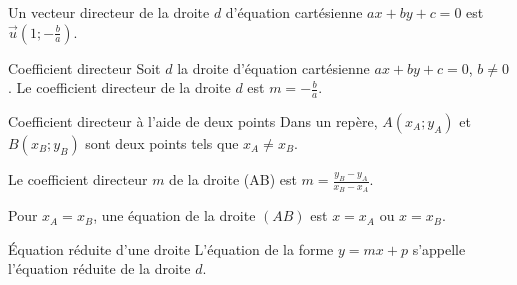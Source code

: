 



\begin{Rq} 
Un vecteur directeur de la droite $d$ d'équation cartésienne $ax+by+c =0$ est $\overrightarrow{u}\left(1;-\frac{b}{a}\right)$.
\end{Rq}




\begin{ThT}{Coefficient directeur}
Soit $d$ la droite d'équation cartésienne $ax+by+c =0$, $b\neq 0$. Le coefficient directeur de la droite $d$ est $m=-\frac{b}{a}$.
\end{ThT}


\begin{ThT}{Coefficient directeur à l'aide de deux points} 
Dans un repère, $A(x_A;y_A)$ et $B(x_B;y_B)$ sont deux points tels que $x_A \neq x_B$.

Le coefficient directeur $m$ de la droite (AB) est $ m = \frac{y_B-y_A}{x_B-x_A}$.

Pour  $x_A = x_B$, une équation de la droite $(AB)$ est $x=x_A$ ou $x=x_B$.
\end{ThT}


\begin{ThT}{Équation réduite d'une droite}
L'équation de la forme $y=mx+p$ s'appelle l'équation réduite de la droite $d$.
\end{ThT}









%
%
%
%
%
%
%
%
%
%
%
%
%
%
%
%
%
%
%

